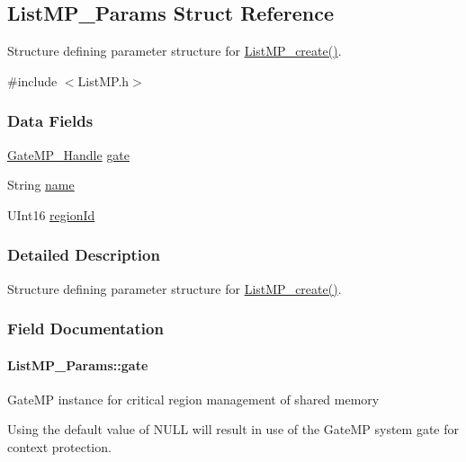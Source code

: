 \subsection{ListMP\_\-Params Struct Reference}
\label{struct_list_m_p___params}


Structure defining parameter structure for \hyperlink{_list_m_p_8h_a71fdd7f30d377065fb70dd095a186d3e}{ListMP\_\-create()}.  




{\ttfamily \#include $<$ListMP.h$>$}

\subsubsection*{Data Fields}
\begin{DoxyCompactItemize}
\item 
\hyperlink{_gate_m_p_8h_ad5bb259f928a14e98d973334bc60ebb3}{GateMP\_\-Handle} \hyperlink{struct_list_m_p___params_a4808f5c75029b059fa388a33e158c2f4}{gate}
\item 
String \hyperlink{struct_list_m_p___params_a4ac70f37c8b5584fa115d6d7f412daba}{name}
\item 
UInt16 \hyperlink{struct_list_m_p___params_af812a3b0ea4698b841bfbf83eada903a}{regionId}
\end{DoxyCompactItemize}


\subsubsection{Detailed Description}
Structure defining parameter structure for \hyperlink{_list_m_p_8h_a71fdd7f30d377065fb70dd095a186d3e}{ListMP\_\-create()}. 

\subsubsection{Field Documentation}
\paragraph[{gate}]{ {\bf ListMP\_\-Params::gate}}\hfill\label{struct_list_m_p___params_a4808f5c75029b059fa388a33e158c2f4}
GateMP instance for critical region management of shared memory

Using the default value of NULL will result in use of the GateMP system gate for context protection. 
